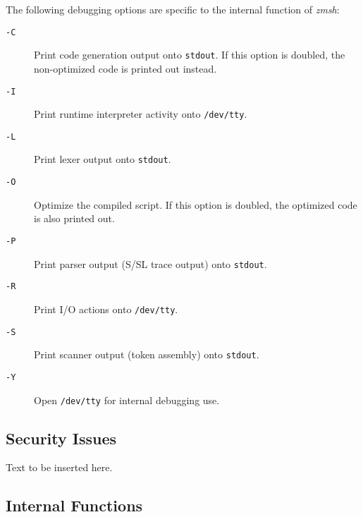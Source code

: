 The following debugging options are specific to the internal 
function of {\em zmsh\/}: 
\begin{description}
\item[{\tt -C}] \mbox{}

Print code generation output onto 
{\tt stdout}. If this option is doubled, the non-optimized 
code is printed out instead. 

\item[{\tt -I}] \mbox{}

Print runtime interpreter activity onto 
{\tt /dev/tty}. 

\item[{\tt -L}] \mbox{}

Print lexer output onto {\tt stdout}. 

\item[{\tt -O}] \mbox{}

Optimize the compiled script. If this 
option is doubled, the optimized code is also printed out. 

\item[{\tt -P}] \mbox{}

Print parser output (S/SL trace output) 
onto {\tt stdout}. 

\item[{\tt -R}] \mbox{}

Print I/O actions onto {\tt /dev/tty}. 

\item[{\tt -S}] \mbox{}

Print scanner output (token assembly) 
onto {\tt stdout}. 

\item[{\tt -Y}] \mbox{}

Open {\tt /dev/tty} for internal 
debugging use. 

\end{description}





\subsection{Security Issues}

Text to be inserted here.




\subsection{Internal Functions}

